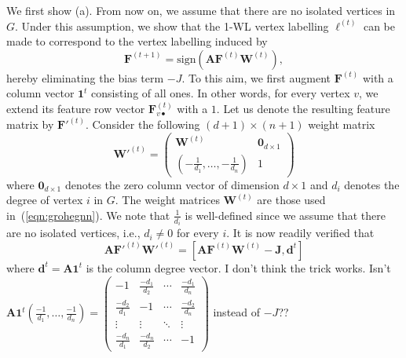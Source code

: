 We first show (a). From now on, we assume that there are no isolated vertices in $G$.
Under this assumption, we show that  the 1-WL vertex labelling $\ell^{(t)}$ can be made to correspond to
the vertex labelling induced by 
\begin{equation}\label{eqn:grohegnn}
  \mathbf{F}^{(t+1)} = \text{sign}\left(
    \mathbf{A}\mathbf{F}^{(t)}\mathbf{W}^{(t)}   \right),
\end{equation}
hereby eliminating the bias term $-J$.
To this aim, we first augment $\mathbf{F}^{(t)}$ with a
column vector $\mathbf{1}^{t}$ consisting of all ones. In other words,
for every vertex $v$, we extend its feature row vector $\mathbf{F}^{(t)}_{v\bullet}$ with a $1$.
Let us denote the resulting feature matrix by
$\mathbf{F'}^{(t)}$.
Consider the following $(d+1)\times (n+1)$ weight matrix
\[
    \mathbf{W'}^{(t)}=\begin{pmatrix}
    \mathbf{W}^{(t)} & \mathbf{0}_{d\times 1}\\
    \left(-\frac{1}{d_1},\ldots,-\frac{1}{d_n}\right) & 1
    \end{pmatrix}
\]
where $\mathbf{0}_{d\times 1}$ denotes the zero column vector of dimension $d\times 1$ and $d_i$ denotes the degree of vertex $i$ in $G$. The weight matrices $\mathbf{W}^{(t)}$ are those used in~(\ref{eqn:grohegnn}). We note that $\frac{1}{d_i}$ is well-defined since we assume that there are no isolated vertices, i.e., $d_i\neq 0$ for every $i$.
It is now readily verified that
$$
    \mathbf{A}\mathbf{F'}^{(t)}\mathbf{W'}^{(t)}=
    [\mathbf{A}\mathbf{F}^{(t)}\mathbf{W}^{(t)}-\mathbf{J},\mathbf{d}^t]
$$
where $\mathbf{d}^t=\mathbf{A}\mathbf{1}^t$ is the column degree vector.
 I don't think the trick works. Isn't $\mathbf{A}\mathbf{1}^t(\frac{-1}{d_1},\ldots, \frac{-1}{d_n})=\begin{pmatrix}
-1 & \frac{-d_1}{d_2} & \cdots & \frac{-d_1}{d_n}\\
\frac{-d_2}{d_1} & -1  & \cdots & \frac{-d_2}{d_n}\\
\vdots & \vdots & \ddots & \vdots\\
\frac{-d_n}{d_1} & \frac{-d_n}{d_2} & \cdots & -1
\end{pmatrix}
$ instead of $-J$??


